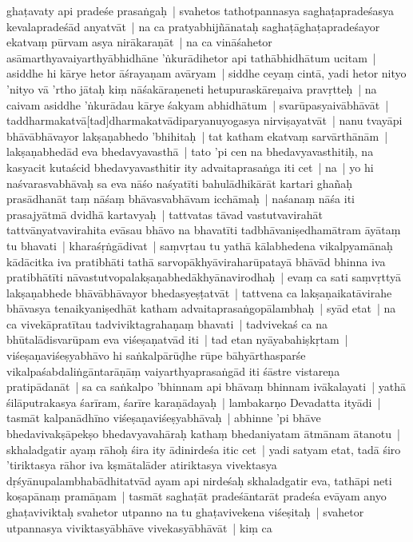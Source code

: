 \documentclass[article,12pt,a4paper]{memoir}%
\newcounter{parCount}
\begin{document}
ghaṭavaty api pradeśe prasaṅgaḥ | svahetos tathotpannasya saghaṭapradeśasya kevalapradeśād anyatvāt | \label{thakur75-123.7} na ca pratyabhijñānataḥ saghaṭāghaṭapradeśayor ekatvaṃ pūrvam asya nirākaraṇāt | \label{thakur75-123.8} na ca vināśahetor asāmarthyavaiyarthyābhidhāne 'ṅkurādihetor api tathābhidhātum ucitam | asiddhe hi kārye hetor āśrayaṇam avāryam | siddhe ceyaṃ cintā, yadi hetor nityo 'nityo vā 'rtho jātaḥ kiṃ nāśakāraṇeneti hetupuraskāreṇaiva pravṛtteḥ | na caivam asiddhe 'ṅkurādau kārye śakyam abhidhātum | svarūpasyaivābhāvāt | taddharmakatvā[tad]dharmakatvādiparyanuyogasya nirviṣayatvāt | \label{thakur75-123.13} nanu tvayāpi bhāvābhāvayor lakṣaṇabhedo 'bhihitaḥ | tat katham ekatvaṃ sarvārthānām | lakṣaṇabhedād eva bhedavyavasthā | tato 'pi cen na bhedavyavasthitiḥ, na kasyacit kutaścid bhedavyavasthitir ity advaitaprasaṅga iti cet | \label{thakur75-123.15} na | yo hi naśvarasvabhāvaḥ sa eva nāśo naśyatīti bahulādhikārāt kartari ghañaḥ prasādhanāt taṃ nāśaṃ bhāvasvabhāvam icchāmaḥ | naśanaṃ nāśa iti prasajyātmā dvidhā kartavyaḥ | tattvatas tāvad vastutvavirahāt tattvānyatvavirahita evāsau bhāvo na bhavatīti tadbhāvaniṣedhamātram āyātaṃ tu bhavati | kharaśṛṅgādivat | saṃvṛtau tu yathā kālabhedena vikalpyamānaḥ kādācitka iva pratibhāti tathā sarvopākhyāviraharūpatayā bhāvād bhinna iva pratibhātīti nāvastutvopalakṣaṇabhedākhyānavirodhaḥ | evaṃ ca sati saṃvṛttyā lakṣaṇabhede bhāvābhāvayor bhedasyeṣṭatvāt | tattvena ca lakṣaṇaikatāvirahe bhāvasya tenaikyaniṣedhāt katham advaitaprasaṅgopālambhaḥ | \label{thakur75-123.24} syād etat | na ca vivekāpratītau tadviviktagrahaṇaṃ bhavati | tadvivekaś ca na bhūtalādisvarūpam eva viśeṣaṇatvād iti | \label{thakur75-123.25} tad etan nyāyabahiṣkṛtam | viśeṣaṇaviśeṣyabhāvo hi saṅkalpārūḍhe rūpe bāhyārthasparśe vikalpaśabdaliṅgāntarāṇāṃ vaiyarthyaprasaṅgād iti śāstre vistareṇa pratipādanāt | sa ca saṅkalpo 'bhinnam api bhāvaṃ bhinnam ivākalayati | yathā śilāputrakasya śarīram, śarīre karaṇādayaḥ | lambakarṇo Devadatta ityādi | tasmāt kalpanādhīno viśeṣaṇaviśeṣyabhāvaḥ | abhinne 'pi bhāve bhedavivakṣāpekṣo bhedavyavahāraḥ kathaṃ bhedaniyatam ātmānam ātanotu | \label{thakur75-123.31} skhaladgatir ayaṃ rāhoḥ śira ity ādinirdeśa itic cet | \label{thakur75-123.31a} yadi satyam etat, tadā śiro 'tiriktasya rāhor iva kṣmātalāder atiriktasya vivektasya dṛśyānupalambhabādhitatvād ayam api nirdeśaḥ skhaladgatir eva, tathāpi neti koṣapānaṃ pramāṇam | tasmāt saghaṭāt pradeśāntarāt pradeśa evāyam anyo ghaṭaviviktaḥ svahetor utpanno na tu ghaṭavivekena viśeṣitaḥ | svahetor utpannasya viviktasyābhāve vivekasyābhāvāt | \label{thakur75-124.3} kiṃ ca
	{}
	\pend%
      
\end{document}
